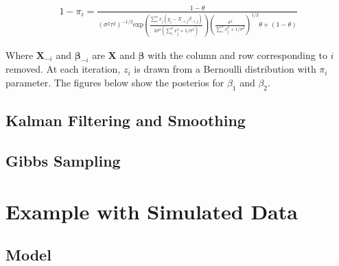 \documentclass[12pt]{article}
\begin{document}
\begin{align}
    1-\pi_i = \frac{1-\theta}{(\sigma^2\tau^2)^{-1/2}\text{exp}\left(\frac{\sum_1^n x_j(y_j - X_{-i, j}\beta_{-i, j})}{2\sigma^2(\sum_1^n x_j^2 + 1/\sigma^2)}\right)  \left(\frac{\sigma^2}{\sum_1^n x_j^2 + 1/\sigma^2}\right)^{1/2}\theta   + (1-\theta)  }
\end{align}

Where $\boldsymbol{X}_{-i}$ and $\boldsymbol{\beta}_{-i}$ are $\boldsymbol{X}$ and $\boldsymbol{\beta}$ with the column and row corresponding to $i$ removed. At each iteration, $z_i$ is drawn from a Bernoulli distribution with $\pi_i$ parameter. The figures below show the posterios for $\beta_1$ and $\beta_2$.





\subsection{Kalman Filtering and Smoothing}
\subsection{Gibbs Sampling}

\section{Example with Simulated Data}\label{toy}
\subsection{Model}


 

\end{document}
